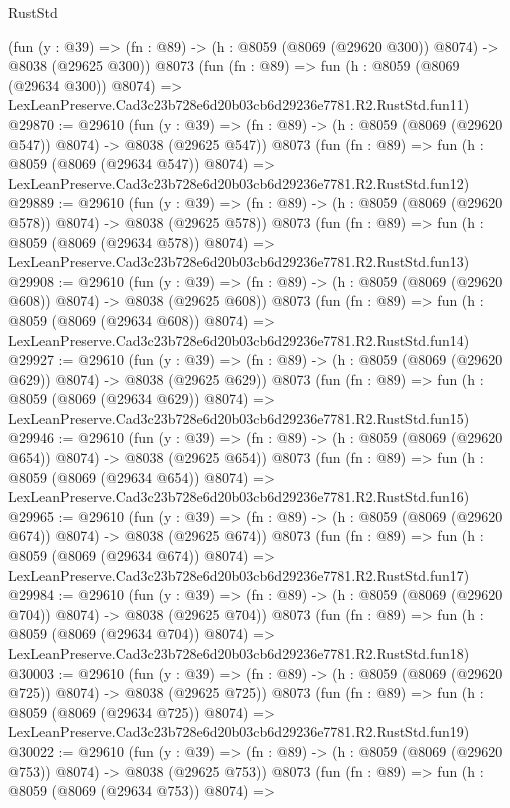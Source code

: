 \begin{lexlean}{RustStd}
\begin{coremodule}
    (fun (y : @39) => (fn : @89) -> (h : @8059 (@8069 (@29620 @300)) @8074) -> @8038 (@29625 @300))
    @8073
    (fun (fn : @89) =>
    fun (h : @8059 (@8069 (@29634 @300)) @8074) =>
    LexLeanPreserve.Cad3c23b728e6d20b03cb6d29236e7781.R2.RustStd.fun11)
@29870 := @29610
    (fun (y : @39) => (fn : @89) -> (h : @8059 (@8069 (@29620 @547)) @8074) -> @8038 (@29625 @547))
    @8073
    (fun (fn : @89) =>
    fun (h : @8059 (@8069 (@29634 @547)) @8074) =>
    LexLeanPreserve.Cad3c23b728e6d20b03cb6d29236e7781.R2.RustStd.fun12)
@29889 := @29610
    (fun (y : @39) => (fn : @89) -> (h : @8059 (@8069 (@29620 @578)) @8074) -> @8038 (@29625 @578))
    @8073
    (fun (fn : @89) =>
    fun (h : @8059 (@8069 (@29634 @578)) @8074) =>
    LexLeanPreserve.Cad3c23b728e6d20b03cb6d29236e7781.R2.RustStd.fun13)
@29908 := @29610
    (fun (y : @39) => (fn : @89) -> (h : @8059 (@8069 (@29620 @608)) @8074) -> @8038 (@29625 @608))
    @8073
    (fun (fn : @89) =>
    fun (h : @8059 (@8069 (@29634 @608)) @8074) =>
    LexLeanPreserve.Cad3c23b728e6d20b03cb6d29236e7781.R2.RustStd.fun14)
@29927 := @29610
    (fun (y : @39) => (fn : @89) -> (h : @8059 (@8069 (@29620 @629)) @8074) -> @8038 (@29625 @629))
    @8073
    (fun (fn : @89) =>
    fun (h : @8059 (@8069 (@29634 @629)) @8074) =>
    LexLeanPreserve.Cad3c23b728e6d20b03cb6d29236e7781.R2.RustStd.fun15)
@29946 := @29610
    (fun (y : @39) => (fn : @89) -> (h : @8059 (@8069 (@29620 @654)) @8074) -> @8038 (@29625 @654))
    @8073
    (fun (fn : @89) =>
    fun (h : @8059 (@8069 (@29634 @654)) @8074) =>
    LexLeanPreserve.Cad3c23b728e6d20b03cb6d29236e7781.R2.RustStd.fun16)
@29965 := @29610
    (fun (y : @39) => (fn : @89) -> (h : @8059 (@8069 (@29620 @674)) @8074) -> @8038 (@29625 @674))
    @8073
    (fun (fn : @89) =>
    fun (h : @8059 (@8069 (@29634 @674)) @8074) =>
    LexLeanPreserve.Cad3c23b728e6d20b03cb6d29236e7781.R2.RustStd.fun17)
@29984 := @29610
    (fun (y : @39) => (fn : @89) -> (h : @8059 (@8069 (@29620 @704)) @8074) -> @8038 (@29625 @704))
    @8073
    (fun (fn : @89) =>
    fun (h : @8059 (@8069 (@29634 @704)) @8074) =>
    LexLeanPreserve.Cad3c23b728e6d20b03cb6d29236e7781.R2.RustStd.fun18)
@30003 := @29610
    (fun (y : @39) => (fn : @89) -> (h : @8059 (@8069 (@29620 @725)) @8074) -> @8038 (@29625 @725))
    @8073
    (fun (fn : @89) =>
    fun (h : @8059 (@8069 (@29634 @725)) @8074) =>
    LexLeanPreserve.Cad3c23b728e6d20b03cb6d29236e7781.R2.RustStd.fun19)
@30022 := @29610
    (fun (y : @39) => (fn : @89) -> (h : @8059 (@8069 (@29620 @753)) @8074) -> @8038 (@29625 @753))
    @8073
    (fun (fn : @89) =>
    fun (h : @8059 (@8069 (@29634 @753)) @8074) =>

\end{coremodule}
\end{lexlean}
